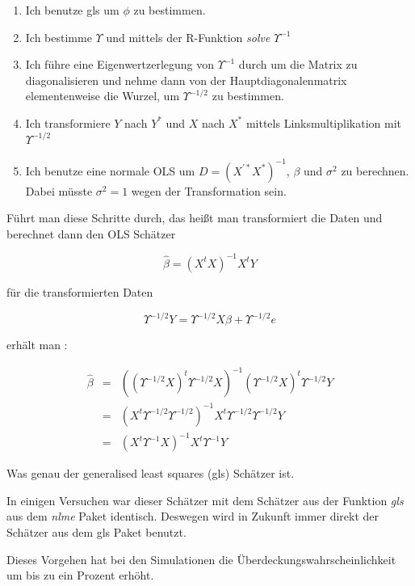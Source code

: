 \documentclass[12pt,a4paper]{article}
\theoremstyle{definition}
\theoremstyle{definition}
\theoremstyle{definition}
\begin{document}
\begin{enumerate}
\item Ich benutze gls um $\phi$ zu bestimmen.
\item Ich bestimme $\Upsilon$ und mittels der R-Funktion \textit{solve} $\Upsilon^{-1}$ 
\item Ich führe eine Eigenwertzerlegung von $\Upsilon^{-1}$ durch um die Matrix zu diagonalisieren und nehme dann von der Hauptdiagonalenmatrix elementenweise die Wurzel, um $\Upsilon^{-1/2}$ zu bestimmen.
\item Ich transformiere $Y$ nach $Y^{*}$ und $X$ nach $X^{*}$ mittels Linksmultiplikation mit $\Upsilon^{-1/2}$
\item Ich benutze eine normale OLS um $D=(X^{'*}X^{*})^{-1}$, $\beta$ und $\sigma^2$ zu berechnen. Dabei müsste $\sigma^2 = 1 $ wegen der Transformation sein.
\end{enumerate}

Führt man diese Schritte durch, das heißt man transformiert die Daten und berechnet dann den OLS Schätzer 

\begin{equation*}
\hat{\beta} = (X^{t} X)^{-1} X^{t} Y
\end{equation*}

für die transformierten Daten 

\begin{equation*}
\Upsilon^{-1/2} Y = \Upsilon^{-1/2} X \beta + \Upsilon^{-1/2} e
\end{equation*}

erhält man :

\begin{eqnarray*}
\hat{\beta} &=& ((\Upsilon^{-1/2} X)^{t} \Upsilon^{-1/2} X)^{-1} (\Upsilon^{-1/2} X)^{t} \Upsilon^{-1/2} Y \\
&=& (X^{t} \Upsilon^{-1/2} \Upsilon^{-1/2})^{-1} X^{t} \Upsilon^{-1/2} \Upsilon^{-1/2} Y \\
&=& (X^{t} \Upsilon^{-1} X)^{-1} X^{t} \Upsilon^{-1} Y
\end{eqnarray*}
 
Was genau der generalised least squares (gls) Schätzer ist.

In einigen Versuchen war dieser Schätzer mit dem Schätzer aus der Funktion \textit{gls} aus dem \textit{nlme} Paket identisch. Deswegen wird in Zukunft immer direkt der Schätzer aus dem gls Paket benutzt.

Dieses Vorgehen hat bei den Simulationen die Überdeckungswahrscheinlichkeit um bis zu ein Prozent erhöht.
\end{document}
